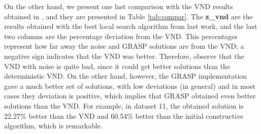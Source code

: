 \documentclass[10pt,twoside]{article}
\begin{document}
On the other hand, we present one last comparison with the VND results obtained in \cite{ls}, and they are presented in Table \ref{tab:compar}. The \textbf{z\_vnd} are the results obtained with the best local search algorithm from last work, and the last two columns are the percentage deviation from the VND. This percentages represent how far away the noise and GRASP solutions are from the VND; a negative sign indicates that the VND was better. Therefore, observe that the VND with noise is quite bad, since it could get better solutions than the deterministic VND. On the other hand, however, the GRASP implementation gave a much better set of solutions, with low deviations (in general) and in most cases they deviation is positive, which implies that GRASP obtained even better solutions than the VND. For example, in dataset 11, the obtained solution is 22.27\% better than the VND and 60.54\% better than the initial constructive algorithm, which is remarkable.
\end{document}
